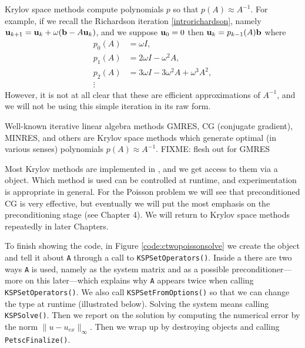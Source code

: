 
Krylov space methods compute polynomials $p$ so that $p(A) \approx A^{-1}$.  For example, if we recall the Richardson iteration \eqref{introrichardson}, namely $\mathbf{u}_{k+1} = \mathbf{u}_k + \omega (\mathbf{b} - A \mathbf{u}_k)$, and we suppose $\mathbf{u}_0=0$ then $\mathbf{u}_k = p_{k-1}(A) \mathbf{b}$ where
\begin{align*}
p_0(A) &= \omega I, \\
p_1(A) &= 2 \omega I - \omega^2 A, \\
p_2(A) &= 3 \omega I - 3 \omega^2 A + \omega^3 A^2, \\
\vdots
\end{align*}
However, it is not at all clear that these are efficient approximations of $A^{-1}$, and we will not be using this simple iteration in its raw form.


Well-known iterative linear algebra methods GMRES, CG (conjugate gradient), MINRES, and others \citep{Greenbaum1997,Saad2003} are Krylov space methods which generate optimal (in various senses) polynomials $p(A) \approx A^{-1}$. FIXME: flesh out for GMRES

Most Krylov methods are implemented in \PETSc, and we get access to them via a \pKSP object.  Which method is used can be controlled at runtime, and experimentation is appropriate in general.  For the Poisson problem we will see that preconditioned CG is very effective, but eventually we will put the most emphasis on the preconditioning stage (see Chapter 4).  We will return to Krylov space methods repeatedly in later Chapters.

To finish showing the code, in Figure \ref{code:ctwopoissonsolve} we create the \pKSP object and tell it about \texttt{A} through a call to \texttt{KSPSetOperators()}.  Inside a \pKSP there are two ways \texttt{A} is used, namely as the system matrix and as a possible preconditioner---more on this later---which explains why \texttt{A} appears twice when calling \texttt{KSPSetOperators()}.  We also call \texttt{KSPSetFromOptions()} so that we can change the \pKSP type at runtime (illustrated below).  Solving the system means calling \texttt{KSPSolve()}.  Then we report on the solution by computing the numerical error by the norm $\|u-u_{ex}\|_\infty$.  Then we wrap up by destroying objects and calling \texttt{PetscFinalize()}.


